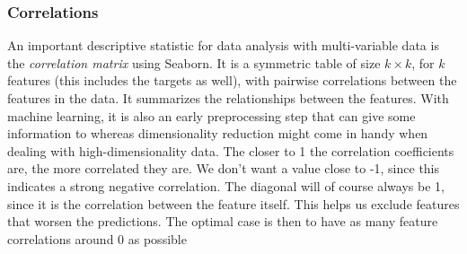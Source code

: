 \documentclass[a4paper, american, 12pt]{report}
\begin{document}
	\subsubsection{Correlations}
	\label{subsubsect:Method-Correlations}
	An important descriptive statistic for data analysis with multi-variable data is the \textit{correlation matrix} using Seaborn\cite{Seaborn}. It is a symmetric table of size $k\times k$, for $k$ features (this includes the targets as well), with pairwise correlations between the features in the data. It summarizes the relationships between the features. With machine learning, it is also an early preprocessing step that can give some information to whereas dimensionality reduction might come in handy when dealing with high-dimensionality data. The closer to 1 the correlation coefficients are, the more correlated they are. We don't want a value close to -1, since this indicates a strong negative correlation. The diagonal will of course always be 1, since it is the correlation between the feature itself. This helps us exclude features that worsen the predictions. The optimal case is then to have as many feature correlations around 0 as possible
	
\end{document}
